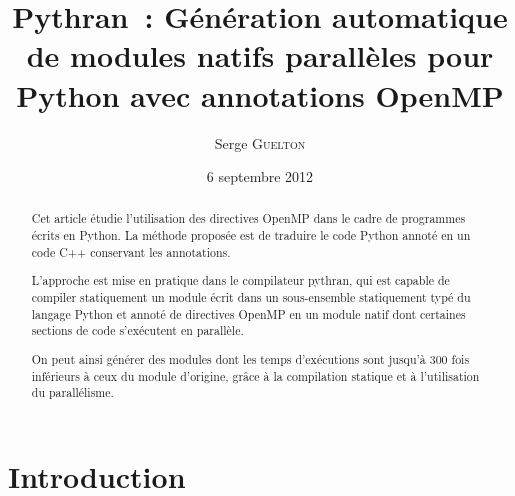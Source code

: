 \documentclass[renpar]{compas2013}
\begin{document}
\title{Pythran~: Génération automatique de modules natifs parallèles pour
Python avec annotations OpenMP}


\author{Serge \textsc{Guelton}}%

\address{École Normale Supérieure,\\
Département d'informatique\\
45 rue d'Ulm, F-75230 Paris Cedex 05 -- France\\
serge.guelton@telecom-bretagne.eu}

\date{6 septembre 2012}

\maketitle

\begin{abstract}
  Cet article étudie l'utilisation des directives OpenMP dans le cadre de
  programmes écrits en Python. La méthode proposée est de traduire le
  code Python annoté en un code C++ conservant les annotations.
  
  L'approche est mise en pratique dans le compilateur pythran, qui est
  capable de compiler statiquement un module écrit dans un sous-ensemble
  statiquement typé du langage Python et annoté de directives OpenMP en un
  module natif dont certaines sections de code s'exécutent en parallèle. 

  On peut ainsi générer des modules dont les temps d'exécutions sont
  jusqu'à 300 fois inférieurs à ceux du module d'origine, grâce à la compilation
  statique et à l'utilisation du parallélisme.
  
\end{abstract}

	
\section{Introduction}
\end{document}
